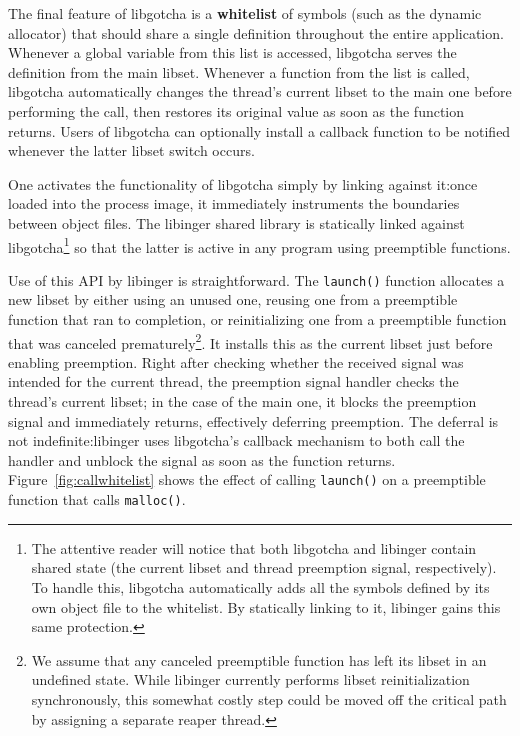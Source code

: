 The final feature of libgotcha is a \textbf{whitelist} of symbols (such as the
dynamic allocator) that should share a single definition throughout the entire
application.  Whenever a global variable from this list is accessed, libgotcha serves
the definition from the main libset.  Whenever a function from the list is called,
libgotcha automatically changes the thread's current libset to the main one before
performing the call, then restores its original value as soon as the function
returns.  Users of libgotcha can optionally install a callback function to be
notified whenever the latter libset switch occurs.

One activates the functionality of libgotcha simply by linking against it:\@ once
loaded into the process image, it immediately instruments the boundaries between
object files.  The libinger shared library is statically linked against
libgotcha\footnote{The attentive reader will notice that both libgotcha and libinger
contain shared state (the current libset and thread preemption signal, respectively).
To handle this, libgotcha automatically adds all the symbols defined by its own
object file to the whitelist.  By statically linking to it, libinger gains this same
protection.} so that the latter is active in any program using preemptible functions.

Use of this API by libinger is straightforward.  The \texttt{launch()} function
allocates a new libset by either using an unused one, reusing one from a preemptible
function that ran to completion, or reinitializing one from a preemptible function
that was canceled prematurely\footnote{We assume that any canceled preemptible
function has left its libset in an undefined state.  While libinger currently
performs libset reinitialization synchronously, this somewhat costly step could be
moved off the critical path by assigning a separate reaper thread.}.  It installs
this as the current libset just before enabling preemption.  Right after checking
whether the received signal was intended for the current thread, the preemption
signal handler checks the thread's current libset; in the case of the main one, it
blocks the preemption signal and immediately returns, effectively deferring
preemption.  The deferral is not indefinite:\@ libinger uses libgotcha's callback
mechanism to both call the handler and unblock the signal as soon as the function
returns.  Figure~\ref{fig:callwhitelist} shows the effect of calling
\texttt{launch()} on a preemptible function that calls \texttt{malloc()}.

